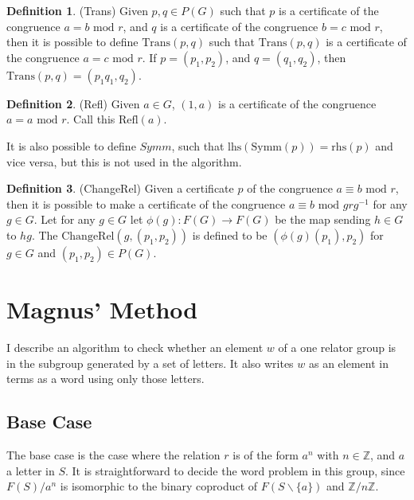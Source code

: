 \documentclass[11pt]{article} %
\theoremstyle{definition}
\theoremstyle{definition}
\theoremstyle{definition}
\theoremstyle{definition}
\theoremstyle{definition}
\theoremstyle{definition}
\newtheorem{subdef}{Definition}[theorem]
\begin{document}
\begin{subdef}(Trans)
  Given $p,q \in P(G)$ such that $p$ is a certificate of the congruence $a = b \text{ mod } r$,
  and $q$ is a certificate of the congruence $b = c \text{ mod } r$, then it is possible to define
  $\text{Trans}(p,q)$ such that $\text{Trans}(p,q)$ is a certificate of the congruence $a = c \text{ mod } r$.
  If $p = (p_1, p_2)$, and $q = (q_1, q_2)$, then $\text{Trans}(p,q) = (p_1q_1, q_2)$.
\end{subdef}

\begin{subdef}(Refl)
  Given $a \in G$, $(1, a)$ is a certificate of the congruence $a = a \text{ mod } r$. Call
  this $\text{Refl}(a)$.
\end{subdef}

It is also possible to define $\textit{Symm}$, such that $\text{lhs}(\text{Symm}(p)) = \text{rhs}(p)$
and vice versa, but this is not used in the algorithm.

\begin{subdef}(ChangeRel)
  Given a certificate $p$ of the congruence $a \equiv b \text{ mod } r$, then it is possible
  to make a certificate of the congruence $a \equiv b \text{ mod } g r g^{-1}$ for any $g \in G$.
  Let for any $g \in G$ let $\phi(g) : F(G) \to F(G)$ be the map sending $h \in G$ to
  $hg$. The $\text{ChangeRel}(g,(p_1,p_2))$ is defined to be $(\phi(g)(p_1), p_2)$ for
  $g \in G$ and $(p_1, p_2) \in P(G)$.
\end{subdef}

\section{Magnus' Method}

I describe an algorithm to check whether an element $w$ of a one relator group is
in the subgroup generated by a set of letters. It also writes $w$ as an element in terms
as a word using only those letters.

\subsection{Base Case}

The base case is the case where the relation $r$ is of the form $a^n$ with
$n \in \mathbb{Z}$, and $a$ a letter in $S$. It is straightforward to decide
the word problem in this group, since $F(S) / a^n$ is isomorphic
to the binary coproduct of $F(S \backslash \{a\})$ and $\mathbb{Z}/n\mathbb{Z}$.
\end{document}
